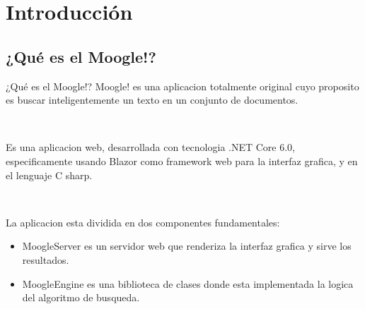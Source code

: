\section{Introducción}

\subsection{¿Qué es el Moogle!?}
\begin{frame}{¿Qué es el Moogle!?}
    Moogle! es una aplicacion totalmente original cuyo proposito es
buscar inteligentemente un texto en un conjunto de documentos.

\

Es una aplicacion web, desarrollada con tecnologia .NET Core
6.0, especificamente usando Blazor como framework web para la
interfaz grafica, y en el lenguaje C sharp.

\

La aplicacion esta dividida en dos componentes fundamentales:
\begin{itemize}
    \item MoogleServer es un servidor web que renderiza la interfaz
    grafica y sirve los resultados.

\pause 
    
    \item MoogleEngine es una biblioteca de clases donde esta
    implementada la logica del algoritmo de busqueda.
\end{itemize}    
\end{frame} 
